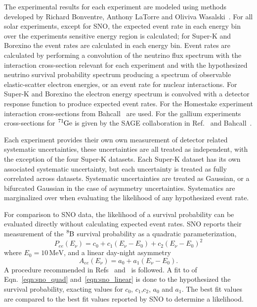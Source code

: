 The experimental results for each experiment are modeled using methods developed
by Richard Bonventre, Anthony LaTorre and Oliviva Wasalski~\cite{richie_thesis}.
For all solar experiments, except for SNO, the expected event rate in each
energy bin over the experiments sensitive energy region is calculated;
for Super-K and Borexino the event rates are calculated in each energy bin.
Event rates are calculated by performing a convolution of the neutrino
flux spectrum with the interaction cross-section relevant for  each experiment
and with the hypothesized neutrino survival probability spectrum
producing a spectrum of observable elastic-scatter electron energies, or
an event rate for nuclear interactions.
For Super-K and Borexino the electron energy spectrum is convolved with a
detector response function to produce expected event rates.
For the Homestake experiment interaction cross-sections from Bahcall~\citep{bahcall_chlorine}
are used.
For the gallium experiments cross-sections for $\ce{^{71}Ge}$ is given by
the SAGE collaboration in Ref.~\citep{sage_xs} and Bahcall~\citep{bahcall_gallium}.

Each experiment provides their own own measurement of detector
related systematic uncertainties, these uncertainties are all treated as independent,
with the exception of the four Super-K datasets.
 Each Super-K dataset has its own associated systematic uncertainty,
but each uncertainty is treated as fully correlated across datasets.
Systematic uncertainties are treated as Gaussian, or a bifurcated
Gaussian in the case of asymmetry uncertainties.
Systematics are marginalized over when evaluating the likelihood
of any hypothesized event rate.

For comparison to SNO data, the likelihood of a survival probability can be evaluated
directly without calculating expected event rates.
SNO reports their measurement of the $\ce{^{8}B}$ survival probability as a quadratic
parameterization,
\begin{equation}
P_{ee}(E_{\nu}) = c_{0} + c_{1}(E_{\nu} - E_{0}) + c_{2}(E_{\nu} - E_{0})^2
\label{eqn:sno_quad}
\end{equation}
where $E_{0}= 10\,\mathrm{MeV}$,
and a linear day-night asymmetry
\begin{equation}
A_{ee}(E_{\nu}) = a_{0} + a_{1}(E_{\nu} - E_{0})\text{.}
\label{eqn:sno_linear}
\end{equation}
A procedure recommended in Refs~\citep{sno_leta} and~\citep{sno_combined} is followed.
A fit to of Eqn.~\eqref{eqn:sno_quad} and~\eqref{eqn:sno_linear} is done to the hypothesized the survival probability,
exacting values for $c_{0}$, $c_{1}$,$c_{2}$, $a_{0}$ and $a_{1}$.
The best fit values are compared to the best fit values reported by SNO to
determine a likelihood.

